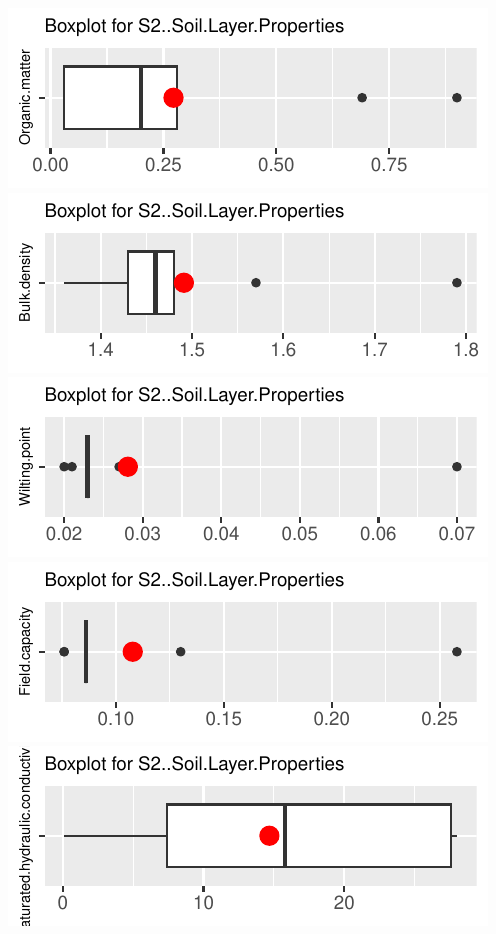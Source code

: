 \documentclass[
]{article}
\begin{document}
\includegraphics{FL_Crop_BMP_QA_single_dataset_files/figure-latex/check-content-of-sheets-56.pdf}
\includegraphics{FL_Crop_BMP_QA_single_dataset_files/figure-latex/check-content-of-sheets-57.pdf}
\includegraphics{FL_Crop_BMP_QA_single_dataset_files/figure-latex/check-content-of-sheets-58.pdf}
\includegraphics{FL_Crop_BMP_QA_single_dataset_files/figure-latex/check-content-of-sheets-59.pdf}
\includegraphics{FL_Crop_BMP_QA_single_dataset_files/figure-latex/check-content-of-sheets-60.pdf}
\end{document}
